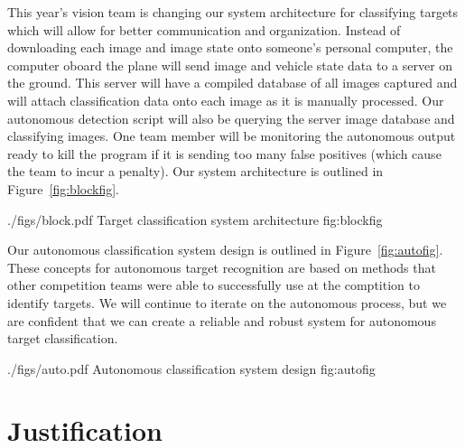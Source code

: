 \documentclass[]{auvsi_doc}
\begin{document}
This year's vision team is changing our system architecture for classifying targets which will
 allow for better communication and organization. Instead of downloading each image and image state
onto someone's personal computer, the computer oboard the plane will send image and vehicle state
data to a server on the ground. This server will have a compiled database of all images captured
and will attach classification data onto each image as it is manually processed. Our
autonomous detection script will also be querying the server image database and classifying
images. One team member will be monitoring the autonomous output ready to kill the
program if it is sending too many false positives (which cause the team to incur a
penalty). Our system architecture is outlined in Figure~\ref{fig:blockfig}.

\AUVSIFigure
{./figs/block.pdf}
{\textwidth}
{Target classification system architecture}
{fig:blockfig}

Our autonomous classification system design is outlined in Figure~\ref{fig:autofig}.
These concepts for autonomous target recognition are based on methods that
other competition teams were able to successfully use at the comptition to
identify targets. We will continue to iterate on the autonomous process, but
we are confident that we can create a reliable and robust system for autonomous
target classification.

\AUVSIFigure
{./figs/auto.pdf}
{\textwidth}
{Autonomous classification system design}
{fig:autofig}

\section{Justification}
\end{document}
